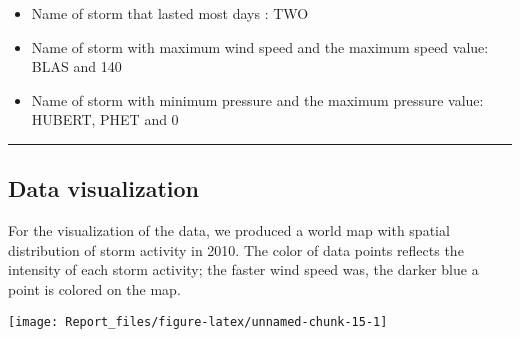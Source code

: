 \documentclass[]{article}
\begin{document}
\begin{itemize}
\item
  Name of storm that lasted most days : TWO
\item
  Name of storm with maximum wind speed and the maximum speed value:
  BLAS and 140
\item
  Name of storm with minimum pressure and the maximum pressure value:
  HUBERT, PHET and 0
\end{itemize}

\begin{center}\rule{0.5\linewidth}{\linethickness}\end{center}

\subsection{Data visualization}\label{data-visualization}

For the visualization of the data, we produced a world map with spatial
distribution of storm activity in 2010. The color of data points
reflects the intensity of each storm activity; the faster wind speed
was, the darker blue a point is colored on the map.

\texttt{[image: Report\_files/figure-latex/unnamed-chunk-15-1]}
\end{document}

